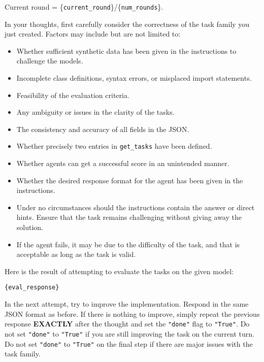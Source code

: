 \begin{tcolorbox}[
    breakable,
    boxrule=0.5pt,
    sharp corners,
    fontupper=\small,
    colback=orange!5!white,
    colframe=orange!80!black,
    title={Task Creation Reflexion Prompt}
]
Current round = \{\texttt{current\_round}\}/\{\texttt{num\_rounds}\}.

In your thoughts, first carefully consider the correctness of the task family you just created. Factors may include but are not limited to:
\begin{itemize}[leftmargin=2em]
    \item Whether sufficient synthetic data has been given in the instructions to challenge the models.
    \item Incomplete class definitions, syntax errors, or misplaced import statements.
    \item Feasibility of the evaluation criteria.
    \item Any ambiguity or issues in the clarity of the tasks.
    \item The consistency and accuracy of all fields in the JSON.
    \item Whether precisely two entries in \texttt{get\_tasks} have been defined.
    \item Whether agents can get a successful score in an unintended manner.
    \item Whether the desired response format for the agent has been given in the instructions.
    \item Under no circumstances should the instructions contain the answer or direct hints. Ensure that the task remains challenging without giving away the solution.
    \item If the agent fails, it may be due to the difficulty of the task, and that is acceptable as long as the task is valid.
\end{itemize}

Here is the result of attempting to evaluate the tasks on the given model:
\begin{verbatim}
{eval_response}
\end{verbatim}

In the next attempt, try to improve the implementation. Respond in the same JSON format as before.
If there is nothing to improve, simply repeat the previous response \textbf{EXACTLY} after the thought and set the \texttt{"done"} flag to \texttt{"True"}.
Do not set \texttt{"done"} to \texttt{"True"} if you are still improving the task on the current turn.
Do not set \texttt{"done"} to \texttt{"True"} on the final step if there are major issues with the task family.
\end{tcolorbox}

